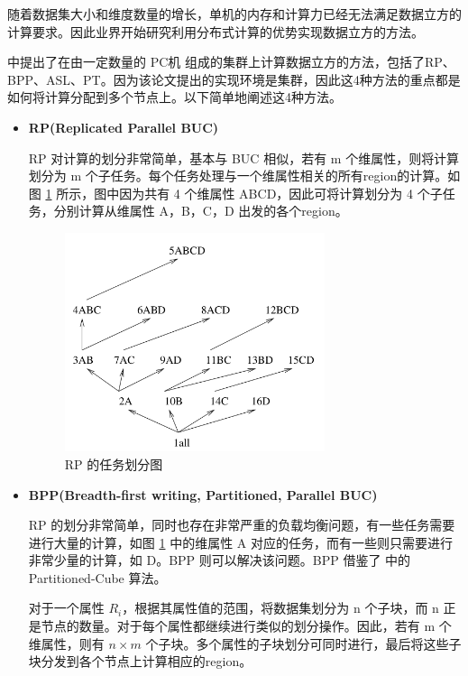 随着数据集大小和维度数量的增长，单机的内存和计算力已经无法满足数据立方的计算要求。因此业界开始研究利用分布式计算的优势实现数据立方的方法。\cite{nandi2011distributed} \cite{dehne2006cgmcube} \cite{ng2001iceberg} \cite{lee2012efficient}

\cite{ng2001iceberg} 中提出了在由一定数量的 PC机 组成的集群上计算数据立方的方法，包括了RP、BPP、ASL、PT。因为该论文提出的实现环境是集群，因此这4种方法的重点都是如何将计算分配到多个节点上。以下简单地阐述这4种方法。

\begin{itemize}

\item \textbf{RP(Replicated Parallel BUC)}

RP 对计算的划分非常简单，基本与 BUC 相似，若有 m 个维属性，则将计算划分为 m 个子任务。每个任务处理与一个维属性相关的所有region的计算。如图 \ref{cluster_rp} 所示，图中因为共有 4 个维属性 ABCD，因此可将计算划分为 4 个子任务，分别计算从维属性 A，B，C，D 出发的各个region。

\begin{figure}[!htb]
\centering\includegraphics[width=3in]{picture/ch_current_research/cluster_rp} 
\caption{RP 的任务划分图}\label{cluster_rp} 
\end{figure} 

\item \textbf{BPP(Breadth-first writing, Partitioned, Parallel BUC)}

RP 的划分非常简单，同时也存在非常严重的负载均衡问题，有一些任务需要进行大量的计算，如图 \ref{cluster_rp} 中的维属性 A 对应的任务，而有一些则只需要进行非常少量的计算，如 D。BPP 则可以解决该问题。BPP 借鉴了 \cite{ross1997fast} 中的 Partitioned-Cube 算法。

对于一个属性 ${R}_{i}$，根据其属性值的范围，将数据集划分为 n 个子块，而 n 正是节点的数量。对于每个属性都继续进行类似的划分操作。因此，若有 m 个维属性，则有 $n \times m$ 个子块。多个属性的子块划分可同时进行，最后将这些子块分发到各个节点上计算相应的region。


\end{itemize}
